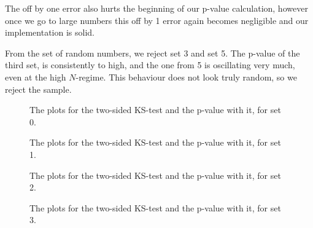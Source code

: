 The off by one error also hurts the beginning of our p-value calculation, however once we go to large numbers this off by 1 error again becomes negligible and our implementation is solid.

From the set of random numbers, we reject set 3 and set 5. The p-value of the third set, is consistently to high, and the one from 5 is oscillating very much, even at the high $N$-regime. This behaviour does not look truly random, so we reject the sample.


 \begin{figure}
    \centering
    \qquad
    \caption{The plots for the two-sided KS-test and the p-value with it, for set 0.}

  \end{figure}
   \begin{figure}
    \centering
    \qquad
    \caption{The plots for the two-sided KS-test and the p-value with it, for set 1.}

  \end{figure}
   \begin{figure}
    \centering
    \qquad
    \caption{The plots for the two-sided KS-test and the p-value with it, for set 2.}

  \end{figure}
   \begin{figure}
    \centering
    \qquad
    \caption{The plots for the two-sided KS-test and the p-value with it, for set 3.}
    
  \end{figure}
  
